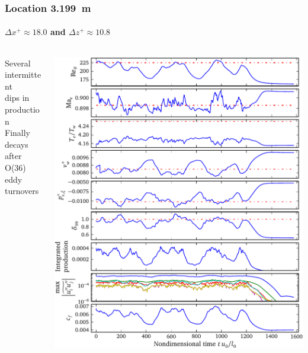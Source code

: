 \documentclass[mathserif]{beamer}
\begin{document}
\begin{frame}
    \frametitle{Location 3.199~m}
    \framesubtitle{$\Delta{}x^{+}\approx{}18.0$ and $\Delta{}z^{+}\approx{}10.8$}
    \begin{columns}[c,onlytextwidth]
    \begin{column}{.35\linewidth}
        \scriptsize
        Several intermittent\\dips in production
        \\\bigskip
        Finally decays after\\O(36) eddy turnovers
    \end{column}
    \begin{column}{.65\linewidth}
        \vspace{-3.75em}
        \begin{flushright}
            \includegraphics[height=0.99\textheight]{relam3199}
        \end{flushright}
    \end{column}
    \end{columns}
\end{frame}
\end{document}
